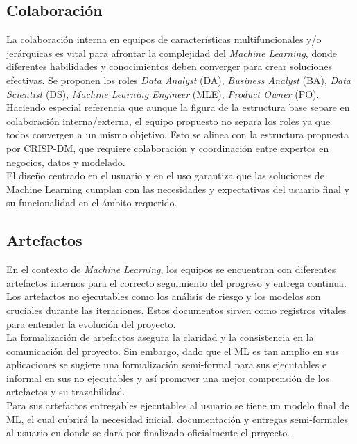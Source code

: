 \documentclass[journal]{IEEEtran}
\begin{document}
\subsection{Colaboración} \label{colaboracion}

La colaboración interna en equipos de características multifuncionales y/o jerárquicas es vital para afrontar la complejidad del \textit{Machine Learning}, donde diferentes habilidades y conocimientos deben converger para crear soluciones efectivas. Se proponen los roles \textit{Data Analyst} (DA), \textit{Business Analyst} (BA), \textit{Data Scientist} (DS), \textit{Machine Learning Engineer} (MLE), \textit{Product Owner} (PO). Haciendo especial referencia que aunque la figura de la estructura base \cite{Cret2013} separe en colaboración interna/externa, el equipo propuesto no separa los roles ya que todos convergen a un mismo objetivo. Esto se alinea con la estructura propuesta por CRISP-DM, que requiere colaboración y coordinación entre expertos en negocios, datos y modelado.\\

El diseño centrado en el usuario y en el uso garantiza que las soluciones de Machine Learning cumplan con las necesidades y expectativas del usuario final y su funcionalidad en el ámbito requerido.

\subsection{Artefactos}

En el contexto de \textit{Machine Learning}, los equipos se encuentran con diferentes artefactos internos para el correcto seguimiento del progreso y entrega continua. Los artefactos no ejecutables como los análisis de riesgo y los modelos son cruciales durante las iteraciones. Estos documentos sirven como registros vitales para entender la evolución del proyecto.\\

La formalización de artefactos asegura la claridad y la consistencia en la comunicación del proyecto. Sin embargo, dado que el ML es tan amplio en sus aplicaciones se sugiere una formalización semi-formal para sus ejecutables e informal en sus no ejecutables y así promover una mejor comprensión de los artefactos y su trazabilidad.\\

Para sus artefactos entregables ejecutables al usuario se tiene un modelo final de ML, el cual cubrirá la necesidad inicial, documentación y entregas semi-formales al usuario en donde se dará por finalizado oficialmente el proyecto.
\end{document}
